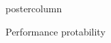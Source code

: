 \documentclass{beamer}
\begin{document}
\begin{frame}
\begin{columns}
\begin{column}{.43\textwidth}
\begin{beamercolorbox}[center]{postercolumn}
\begin{minipage}{.98\textwidth}
{%
%
\begin{myblock}{Performance protability}
\end{myblock}\vfill
}\end{minipage}\end{beamercolorbox}
\end{column}


\end{columns}
\end{frame}
\end{document}
